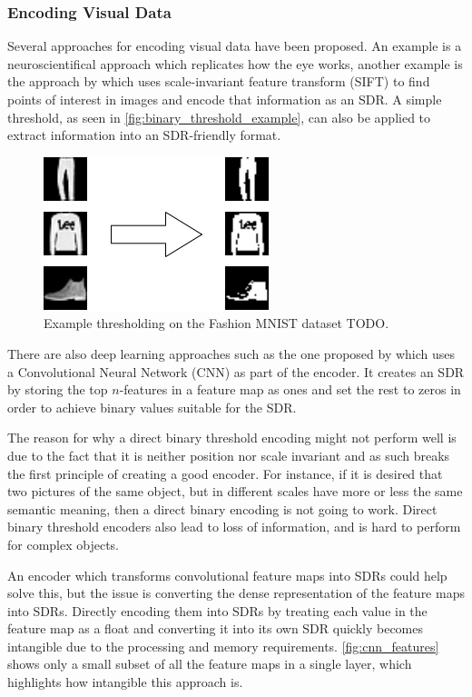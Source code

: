 \subsubsection{Encoding Visual Data}
Several approaches for encoding visual data have been proposed. An example is a neuroscientifical approach which replicates how the eye works\cite{eyeencoder}, another example is the approach by \textcite{ObjectDetectionSIFT} which uses scale-invariant feature transform (SIFT) to find points of interest in images and encode that information as an SDR. A simple threshold, as seen in \autoref{fig:binary_threshold_example}, can also be applied to extract information into an SDR-friendly format.
\begin{figure}[H]
    \centering
    \includegraphics[width=0.55\linewidth]{resources/related_works/binary_threshold_example.png}
    \caption{Example thresholding on the Fashion MNIST dataset TODO.}
    \label{fig:binary_threshold_example}
\end{figure}
\par
There are also deep learning approaches such as the one proposed by \textcite{CNN_HTM} which uses a Convolutional Neural Network (CNN) as part of the encoder. It creates an SDR by storing the top $n$-features in a feature map as ones and set the rest to zeros in order to achieve binary values suitable for the SDR.
\par
The reason for why a direct binary threshold encoding might not perform well is due to the fact that it is neither position nor scale invariant and as such breaks the first principle of creating a good encoder. For instance, if it is desired that two pictures of the same object, but in different scales have more or less the same semantic meaning, then a direct binary encoding is not going to work. Direct binary threshold encoders also lead to loss of information, and is hard to perform for complex objects.
\par
An encoder which transforms convolutional feature maps into SDRs could help solve this, but the issue is converting the dense representation of the feature maps into SDRs. Directly encoding them into SDRs by treating each value in the feature map as a float and converting it into its own SDR quickly becomes intangible due to the processing and memory requirements. \autoref{fig:cnn_features} shows only a small subset of all the feature maps in a single layer, which highlights how intangible this approach is.
